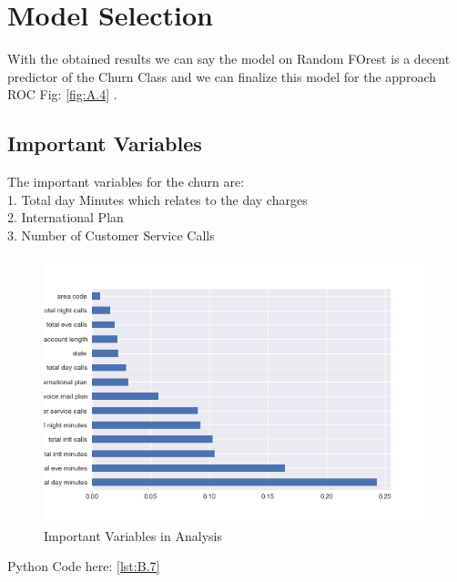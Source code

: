 \documentclass[a4paper,12pt]{report}
\begin{document}
\section{Model Selection}

With the obtained results we can say the model on Random FOrest is a decent predictor of the Churn Class and we can finalize  this model for the approach ROC Fig: \ref{fig:A.4} .
\subsection{Important Variables}
The important variables for the churn are:\\
1. Total day Minutes which relates to the day charges\\
2. International Plan\\
3. Number of Customer Service Calls\\
\begin{figure}[!htbp]
\vspace{5pt}
\centering
\includegraphics[scale = 0.5]{varz_imp.png}
\caption{Important Variables in Analysis}
\label{fig:4.2}
\end{figure}
\FloatBarrier
Python Code here: \ref{lst:B.7}

\appendix
\end{document}
